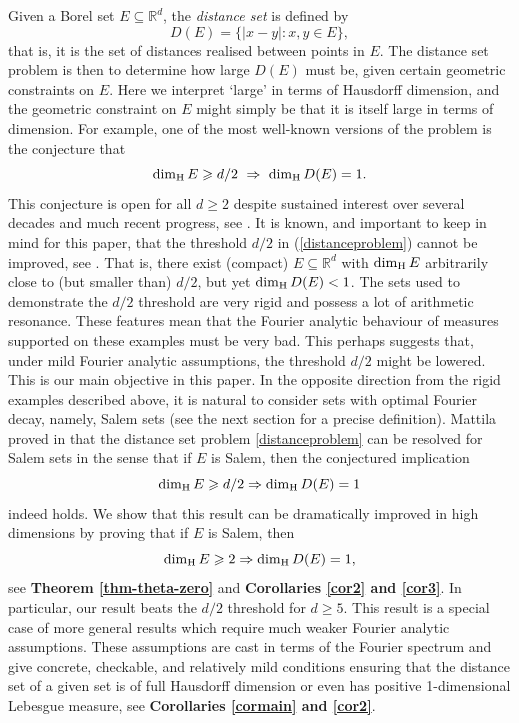 \documentclass[11pt]{amsart}
\numberwithin{equation}{section}
\newcommand{\rd}{\mathbb{R}^d}
\renewcommand{\geq}{\geqslant}
\newcommand{\hd}{\dim_{\textup{H}}}
\theoremstyle{plain}
\theoremstyle{remark}
\newcommand{\Rd}{\mathbb{R}^d}
\begin{document}
Given a Borel set $E \subseteq \Rd$, the \emph{distance set} is defined by
\[
D(E) = \{|x-y| : x, y \in E\},
\]
that is, it is the set of distances realised between points in $E$. The distance set problem is then to determine how large $D(E)$ must be, given certain geometric constraints on $E$.  Here we interpret `large' in terms of Hausdorff dimension, and the geometric constraint on $E$ might simply be that it is itself large in terms of dimension.  For example, one of the most well-known versions of the problem is the conjecture that 
\begin{equation} \label{distanceproblem}
\hd E \geq d/2 \ \Rightarrow \  \hd D(E) = 1.
\end{equation}
This conjecture is open for all $d \geq 2$ despite sustained interest over several decades and much recent progress, see \cite{1/4even,1/4+,yumeng,guth,keletishmerkin,shmerkinwang}. It is known, and important to keep in mind for this paper, that  the threshold $d/2$ in (\ref{distanceproblem}) cannot be improved, see \cite{distance}.  That is, there exist (compact) $E \subseteq \rd$ with $\hd E$  arbitrarily close to (but smaller than) $d/2$, but yet $\hd D(E)<1$.  The sets used to demonstrate the $d/2$ threshold are very rigid and possess a lot of arithmetic resonance.  These features mean that the Fourier analytic behaviour of measures supported on these examples must be very bad.  This perhaps suggests that, under mild Fourier analytic assumptions, the threshold $d/2$ might be lowered.  This is our main objective in this paper.  In the opposite direction from the rigid examples described above, it is natural    to consider sets with optimal Fourier decay, namely, Salem sets (see the next section for a precise definition).  Mattila proved in  \cite{mattiladistance} that the distance set problem \eqref{distanceproblem} can be resolved  for Salem sets in the sense that if $E$ is Salem, then the conjectured implication
\[
\hd E \geq d/2 \Rightarrow \hd D(E) = 1
\]
indeed holds. We show that this result can be dramatically improved in high dimensions by proving that if $E$ is Salem, then
\[
\hd E \geq  2 \Rightarrow \hd D(E) = 1,
\]
see {\bf Theorem \ref{thm-theta-zero}} and {\bf Corollaries \ref{cor2} and \ref{cor3}}. In particular, our result beats the $d/2$ threshold for $d \geq 5$.  This result  is a special case of more general results which require much weaker Fourier analytic assumptions.  These assumptions are cast in terms of the Fourier spectrum and give concrete, checkable, and relatively mild conditions ensuring that the distance set of a given set is of full Hausdorff dimension or even has positive 1-dimensional Lebesgue measure, see  {\bf Corollaries \ref{cormain} and \ref{cor2}}.  
\end{document}
